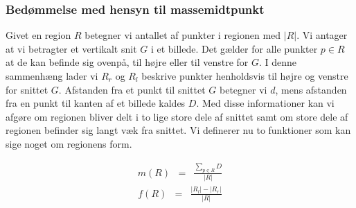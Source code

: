{%

\subsubsection{Bedømmelse med hensyn til massemidtpunkt}
Givet en region $R$ betegner vi antallet af punkter i regionen med
$|R|$. Vi antager at vi betragter et vertikalt snit $G$ i et billede.
Det gælder for alle punkter $p \in R$ at de kan befinde sig ovenpå, til
højre eller til venstre for $G$. I denne sammenhæng lader vi $R_r$ og
$R_l$ beskrive punkter henholdsvis til højre og venstre for snittet $G$.
Afstanden fra et punkt til snittet $G$ betegner vi $d$, mens afstanden
fra en punkt til kanten af et billede kaldes $D$. Med disse
informationer kan vi afgøre om regionen bliver delt i to lige store dele
af snittet samt om store dele af regionen befinder sig langt væk fra
snittet. Vi definerer nu to funktioner som kan sige noget om regionens
form.


\begin{eqnarray}
    m(R) & = & \frac{\sum_{p \in R}{D}}{|R|}
    \label{MPunkt}
\end{eqnarray}
\begin{eqnarray}
    f(R) & = & \frac{|R_{l}| - |R_{r}|}{|R|}
    \label{Fordeling}
\end{eqnarray}


}
